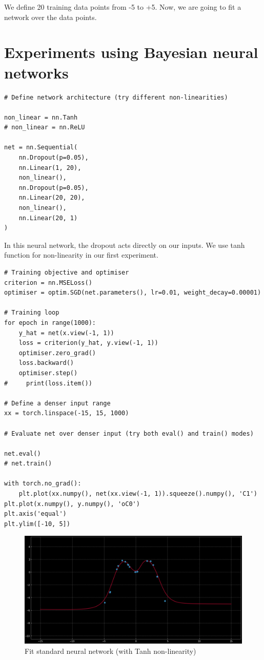 We define 20 training data points from -5 to +5. Now, we are going to fit a network over the data points.

\section{Experiments using Bayesian neural networks}
\begin{verbatim}
# Define network architecture (try different non-linearities)

non_linear = nn.Tanh
# non_linear = nn.ReLU

net = nn.Sequential(
    nn.Dropout(p=0.05),
    nn.Linear(1, 20),
    non_linear(),
    nn.Dropout(p=0.05),
    nn.Linear(20, 20),
    non_linear(),
    nn.Linear(20, 1)
)
\end{verbatim}
In this neural network, the dropout acts directly on our inputs. We use tanh function for non-linearity in our first experiment.  

\begin{verbatim}
# Training objective and optimiser
criterion = nn.MSELoss()
optimiser = optim.SGD(net.parameters(), lr=0.01, weight_decay=0.00001)

# Training loop
for epoch in range(1000):
    y_hat = net(x.view(-1, 1))
    loss = criterion(y_hat, y.view(-1, 1))
    optimiser.zero_grad()
    loss.backward()
    optimiser.step()
#     print(loss.item())

# Define a denser input range
xx = torch.linspace(-15, 15, 1000)

# Evaluate net over denser input (try both eval() and train() modes)

net.eval()
# net.train()

with torch.no_grad():
    plt.plot(xx.numpy(), net(xx.view(-1, 1)).squeeze().numpy(), 'C1')
plt.plot(x.numpy(), y.numpy(), 'oC0')
plt.axis('equal')
plt.ylim([-10, 5])
\end{verbatim}

\begin{figure}[H]
    \centering
    \includegraphics[width=\textwidth]{figs/exp_2.png}
    \caption{Fit standard neural network (with Tanh non-linearity)}
    \label{fig:fit_standardNN}
\end{figure}

